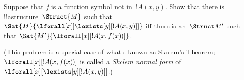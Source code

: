 \documentclass[../../../include/open-logic-section]{subfiles}
\begin{document}
\begin{prob}
Suppose that $f$ is a function symbol not in~$!A(x,y)$. Show that
there is !!a{structure}~$\Struct{M}$ such that
$\Sat{M}{\lforall[x][\lexists[y][!A(x,y)]]}$ iff there is an~$\Struct
M'$ such that $\Sat{M'}{\lforall[x][!A(x,f(x))]}$.

(This problem is a special case of what's known as Skolem's Theorem;
$\lforall[x][!A(x,f(x))]$ is called a \emph{Skolem normal form} of
$\lforall[x][\lexists[y][!A(x,y)]]$.)
\end{prob}
\end{document}

